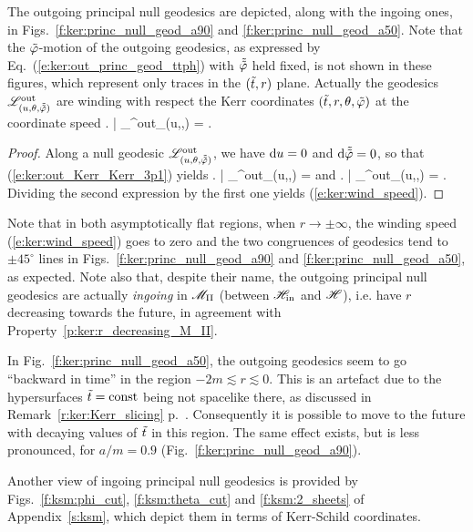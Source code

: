 The outgoing principal null geodesics
are depicted, along with the
ingoing ones, in Figs.~\ref{f:ker:princ_null_geod_a90} and
\ref{f:ker:princ_null_geod_a50}. Note that the ${\tilde\varphi}$-motion of the
outgoing geodesics, as expressed by Eq.~(\ref{e:ker:out_princ_geod_ttph}) with $\tilde{{\tilde\varphi}}$
held fixed, is not shown in these figures, which represent only traces
in the $({\tilde t},r)$ plane. Actually the geodesics $\mathscr{L}^{\rm out}_{(u,\theta,\tilde{{\tilde\varphi}})}$
are winding with respect the Kerr coordinates $({\tilde t},r,\theta,{\tilde\varphi})$
at the coordinate speed
\be \label{e:ker:wind_speed}
    \left. \frac{\D\tph}{\D\ti} \right| _{\Li^{\rm out}_{(u,\th,\tilde{\tph})}} =
     .
\ee
\begin{proof}
Along a null geodesic $\mathscr{L}^{\rm out}_{(u,\theta,\tilde{{\tilde\varphi}})}$, we have
$\mathrm{d} u = 0$ and $\mathrm{d}\tilde{{\tilde\varphi}}=0$, so that (\ref{e:ker:out_Kerr_Kerr_3p1}) yields
\be \label{e:ker:dtdr_dphdr_out}
\left.  \right| _{\Li^{\rm out}_{(u,\th,\tilde{\tph})}}  =     \qquad\mbox{and}\qquad
\left.  \right| _{\Li^{\rm out}_{(u,\th,\tilde{\tph})}} =  .
\ee
Dividing the second expression by the first one yields (\ref{e:ker:wind_speed}).
\end{proof}

Note that in both asymptotically flat regions, when $r\rightarrow \pm\infty$,
the winding speed (\ref{e:ker:wind_speed}) goes to zero
and the two congruences of geodesics tend to $\pm 45^\circ$ lines
in Figs.~\ref{f:ker:princ_null_geod_a90} and
\ref{f:ker:princ_null_geod_a50}, as expected.
Note also that, despite their name, the outgoing principal null geodesics are actually
\emph{ingoing} in $\mathscr{M}_{\rm II}$ (between $\mathscr{H}_{\rm in}$ and $\mathscr{H}$), i.e. have $r$ decreasing
towards the future, in agreement with Property~\ref{p:ker:r_decreasing_M_II}.

\begin{remark}
In Fig.~\ref{f:ker:princ_null_geod_a50},
the outgoing geodesics seem to go ``backward in time'' in the region $-2m \lesssim r \lesssim 0$. This
is an artefact due to the hypersurfaces ${\tilde t} = \mathrm{const}$ being not spacelike
there, as discussed in Remark~\ref{r:ker:Kerr_slicing}
p.~\pageref{r:ker:Kerr_slicing}.
Consequently it is possible to move to the future with decaying values
of ${\tilde t}$ in this region.
The same effect exists, but is less pronounced, for $a/m=0.9$ (Fig.~\ref{f:ker:princ_null_geod_a90}).
\end{remark}

Another view of ingoing principal null geodesics is provided by Figs.~\ref{f:ksm:phi_cut},
\ref{f:ksm:theta_cut} and \ref{f:ksm:2_sheets} of Appendix~\ref{s:ksm}, which
depict them in terms of Kerr-Schild coordinates.

